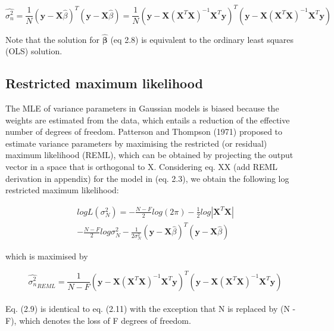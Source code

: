 \begin{equation} \label{eq9:Linear_regression_MLE_solution_sigma}
 \hat{\sigma_n^2} = \frac{1}{N}(\mathbf{y}-\mathbf{X}\hat{\beta})^T(\mathbf{y}-\mathbf{X}\hat{\beta}) = \frac{1}{N}(\mathbf{y}-\mathbf{X}(\mathbf{X}^T\mathbf{X})^{-1}\mathbf{X}^T\mathbf{y})^T(\mathbf{y}-\mathbf{X}(\mathbf{X}^T\mathbf{X})^{-1}\mathbf{X}^T\mathbf{y}) 
\end{equation}

Note that the solution for $\hat{\boldsymbol{\beta}}$ (eq 2.8) is equivalent to the ordinary least squares (OLS) solution.


\subsection{Restricted maximum likelihood}

The MLE of variance parameters in Gaussian models is biased because the weights are estimated from the data, which entails a reduction of the effective number of degrees of freedom.
Patterson and Thompson (1971) proposed to estimate variance parameters by maximising the restricted (or residual) maximum likelihood (REML), which can be obtained by projecting the output vector in a space that is orthogonal to X. 
Considering eq. XX (add REML derivation in appendix) for the model in (eq. 2.3), we obtain the following log restricted maximum likelihood:

\begin{equation} \label{eq10:Linear_regression_log_restricted_likelihood}
\begin{split}
logL(\sigma_N^2) = -\frac{N-F}{2}log(2\pi) - \frac{1}{2}log|\mathbf{X}^T\mathbf{X}| \\
-  \frac{N-F}{2}log\sigma_N^2 - \frac{1}{2\sigma_N^2}(\mathbf{y}-\mathbf{X}\hat{\beta})^T(\mathbf{y}-\mathbf{X}\hat{\beta})  
\end{split}
\end{equation}

which is maximised by

\begin{equation}\label{eq11:Linear_regression_REML_sigma}
\hat{\sigma_n^2}_{REML} =  \frac{1}{N-F}(\mathbf{y}-\mathbf{X}(\mathbf{X}^T\mathbf{X})^{-1}\mathbf{X}^T\mathbf{y})^T(\mathbf{y}-\mathbf{X}(\mathbf{X}^T\mathbf{X})^{-1}\mathbf{X}^T\mathbf{y})
\end{equation}\\

Eq. (2.9) is identical to eq. (2.11) with the exception that N is replaced by (N - F), which denotes the loss of F degrees of freedom.

